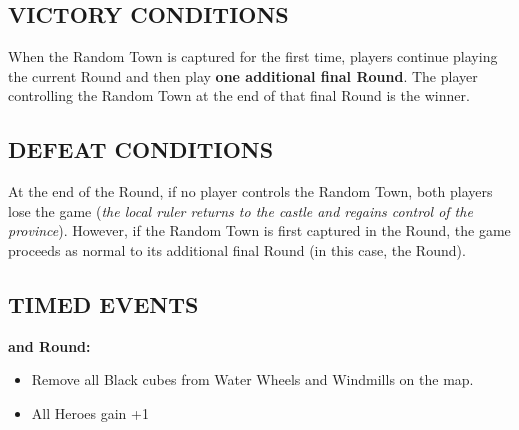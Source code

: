\begin{multicols*}{2}
\subsection*{\MakeUppercase{Victory Conditions}}
When the Random Town is captured for the first time, players continue playing the current Round and then play \textbf{one additional final Round}.
The player controlling the Random Town at the end of that final Round is the winner.

\subsection*{\MakeUppercase{Defeat Conditions}}
At the end of the  Round, if no player controls the Random Town, both players lose the game (\textit{the local ruler returns to the castle and regains control of the province}).
However, if the Random Town is first captured in the  Round, the game proceeds as normal to its additional final Round (in this case, the  Round).

\subsection*{\MakeUppercase{Timed Events}}

  \textbf{ and  Round:}
\begin{itemize}
  \item Remove all Black cubes from Water Wheels and Windmills on the map.
  \item All Heroes gain +1 
\end{itemize}

\end{multicols*}

